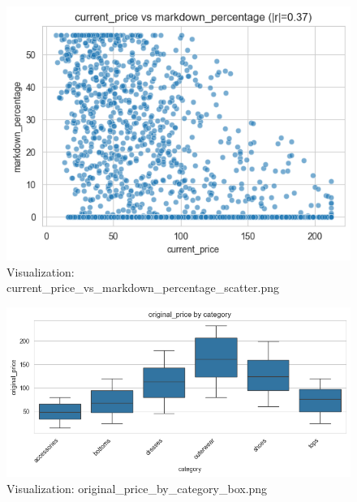 \documentclass{article}%
\begin{document}
\vspace{10pt}%
\\%
\begin{minipage}[c]{0.48\textwidth}%


\begin{figure}[H]%
\centering%
\includegraphics[width=\linewidth]{output/plots/current_price_vs_markdown_percentage_scatter.png}%
\caption{Visualization: current\_price\_vs\_markdown\_percentage\_scatter.png}%
\end{figure}

%
\end{minipage}%
\begin{minipage}[c]{0.48\textwidth}%


\begin{figure}[H]%
\centering%
\includegraphics[width=\linewidth]{output/plots/original_price_by_category_box.png}%
\caption{Visualization: original\_price\_by\_category\_box.png}%
\end{figure}

%
\end{minipage}%
\end{document}
